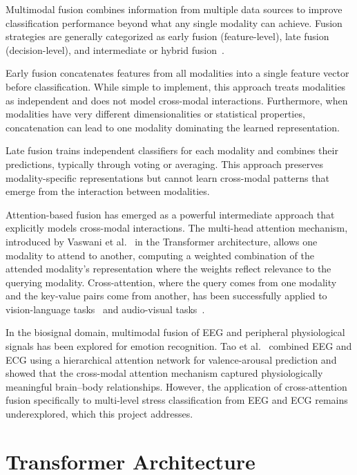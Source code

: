 \documentclass[12pt,letterpaper]{report}
\begin{document}
Multimodal fusion combines information from multiple data sources to improve classification performance beyond what any single modality can achieve. Fusion strategies are generally categorized as early fusion (feature-level), late fusion (decision-level), and intermediate or hybrid fusion~\cite{baltrusaitis2019}.

Early fusion concatenates features from all modalities into a single feature vector before classification. While simple to implement, this approach treats modalities as independent and does not model cross-modal interactions. Furthermore, when modalities have very different dimensionalities or statistical properties, concatenation can lead to one modality dominating the learned representation.

Late fusion trains independent classifiers for each modality and combines their predictions, typically through voting or averaging. This approach preserves modality-specific representations but cannot learn cross-modal patterns that emerge from the interaction between modalities.

Attention-based fusion has emerged as a powerful intermediate approach that explicitly models cross-modal interactions. The multi-head attention mechanism, introduced by Vaswani et al.~\cite{vaswani2017} in the Transformer architecture, allows one modality to attend to another, computing a weighted combination of the attended modality's representation where the weights reflect relevance to the querying modality. Cross-attention, where the query comes from one modality and the key-value pairs come from another, has been successfully applied to vision-language tasks~\cite{lu2019} and audio-visual tasks~\cite{tsai2019}.

In the biosignal domain, multimodal fusion of EEG and peripheral physiological signals has been explored for emotion recognition. Tao et al.~\cite{tao2020} combined EEG and ECG using a hierarchical attention network for valence-arousal prediction and showed that the cross-modal attention mechanism captured physiologically meaningful brain--body relationships. However, the application of cross-attention fusion specifically to multi-level stress classification from EEG and ECG remains underexplored, which this project addresses.

\section{Transformer Architecture}
\label{sec:transformer}
\end{document}
